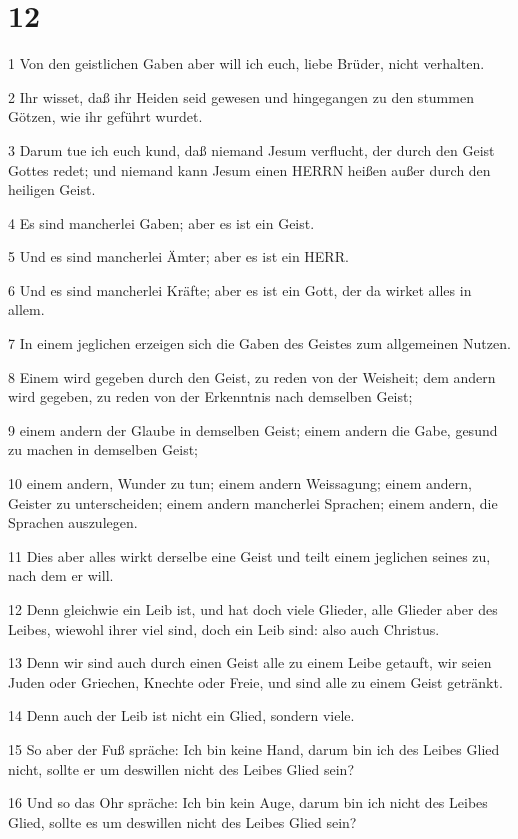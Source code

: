 \chapter{12}

\par 1 Von den geistlichen Gaben aber will ich euch, liebe Brüder, nicht verhalten.
\par 2 Ihr wisset, daß ihr Heiden seid gewesen und hingegangen zu den stummen Götzen, wie ihr geführt wurdet.
\par 3 Darum tue ich euch kund, daß niemand Jesum verflucht, der durch den Geist Gottes redet; und niemand kann Jesum einen HERRN heißen außer durch den heiligen Geist.
\par 4 Es sind mancherlei Gaben; aber es ist ein Geist.
\par 5 Und es sind mancherlei Ämter; aber es ist ein HERR.
\par 6 Und es sind mancherlei Kräfte; aber es ist ein Gott, der da wirket alles in allem.
\par 7 In einem jeglichen erzeigen sich die Gaben des Geistes zum allgemeinen Nutzen.
\par 8 Einem wird gegeben durch den Geist, zu reden von der Weisheit; dem andern wird gegeben, zu reden von der Erkenntnis nach demselben Geist;
\par 9 einem andern der Glaube in demselben Geist; einem andern die Gabe, gesund zu machen in demselben Geist;
\par 10 einem andern, Wunder zu tun; einem andern Weissagung; einem andern, Geister zu unterscheiden; einem andern mancherlei Sprachen; einem andern, die Sprachen auszulegen.
\par 11 Dies aber alles wirkt derselbe eine Geist und teilt einem jeglichen seines zu, nach dem er will.
\par 12 Denn gleichwie ein Leib ist, und hat doch viele Glieder, alle Glieder aber des Leibes, wiewohl ihrer viel sind, doch ein Leib sind: also auch Christus.
\par 13 Denn wir sind auch durch einen Geist alle zu einem Leibe getauft, wir seien Juden oder Griechen, Knechte oder Freie, und sind alle zu einem Geist getränkt.
\par 14 Denn auch der Leib ist nicht ein Glied, sondern viele.
\par 15 So aber der Fuß spräche: Ich bin keine Hand, darum bin ich des Leibes Glied nicht, sollte er um deswillen nicht des Leibes Glied sein?
\par 16 Und so das Ohr spräche: Ich bin kein Auge, darum bin ich nicht des Leibes Glied, sollte es um deswillen nicht des Leibes Glied sein?
